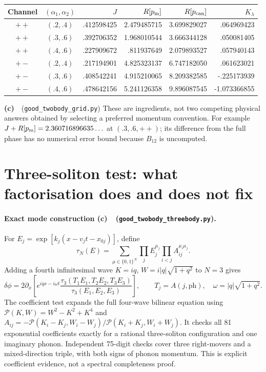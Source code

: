 \documentclass[11pt,a4paper]{article}
\newcommand{\Cc}{\textbf{(c)}\ }
\newcommand{\file}[1]{\nolinkurl{#1}}
\newcommand{\three}{\file{good_twobody_threebody.py}}
\newcommand{\grid}{\file{good_twobody_grid.py}}
\begin{document}
\begin{center}\small
\begin{tabular}{@{}ccrrrr@{}}\toprule
Channel & $(\alpha_1,\alpha_2)$ & $J$ & $R[p_{\rm m}]$ & $R[p_{\rm can}]$ & $K_\lambda$\\\midrule
$++$ & $(.2,.4)$ & .412598425 & 2.479485715 & 3.699829027 & .064969423\\
$++$ & $(.3,.6)$ & .392706352 & 1.968010544 & 3.666344128 & .050081405\\
$++$ & $(.4,.6)$ & .227909672 & .811937649 & 2.079893527 & .057940143\\
$+-$ & $(.2,.4)$ & .217194901 & 4.825323137 & 6.747182050 & .061623021\\
$+-$ & $(.3,.6)$ & .408542241 & 4.915210065 & 8.209382585 & -.225173939\\
$+-$ & $(.4,.6)$ & .478642156 & 5.241126358 & 9.896087545 & -1.073366855\\\bottomrule
\end{tabular}
\end{center}
\Cc\ (\grid) These are ingredients, not two competing physical
answers obtained by selecting a preferred momentum convention.
For example \(J+R[p_{\rm m}]=2.360716896635\ldots\) at
\((.3,.6,++)\); its difference from the full phase has no numerical
error bound because \(B_{12}\) is uncomputed.

\section{Three-soliton test: what factorisation does and does not fix}
\paragraph{Exact mode construction \Cc\ (\three).}
For \(E_j=\exp[k_j(x-v_jt-x_{0j})]\), define
\begin{equation}
 \tau_N(E)=\sum_{\mu\in\{0,1\}^N}
        \prod_j E_j^{\mu_j}\prod_{i<j}A_{ij}^{\mu_i\mu_j}.
\end{equation}
Adding a fourth infinitesimal wave \(K=iq\),
\(W=i|q|\sqrt{1+q^2}\) to \(N=3\) gives
\begin{equation}
 \delta\phi=2\partial_x\left[
     e^{iqx-i\omega t}\frac{\tau_3(T_1E_1,T_2E_2,T_3E_3)}
                                  {\tau_3(E_1,E_2,E_3)}\right],
 \qquad T_j=A(j,\mathrm{ph}),\quad \omega=|q|\sqrt{1+q^2}.
 \label{eq:threephonon}
\end{equation}
The coefficient test expands the full four-wave bilinear equation using
\(\mathcal P(K,W)=W^2-K^2+K^4\) and
\(A_{ij}=-\mathcal P(K_i-K_j,W_i-W_j)/
\mathcal P(K_i+K_j,W_i+W_j)\). It checks all 81 exponential
coefficients exactly for a rational three-soliton configuration and one
imaginary phonon. Independent 75-digit checks cover three right-movers
and a mixed-direction triple, with both signs of phonon momentum.
This is explicit coefficient evidence, not a spectral completeness proof.
\end{document}
